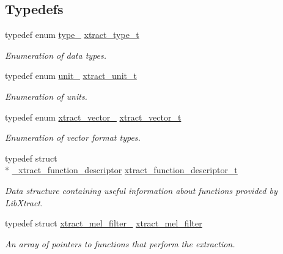 \subsection*{Typedefs}
\begin{DoxyCompactItemize}
\item 
\hypertarget{group__libxtract_ga95b0ed95b4f842dd16e0616aa118ab38}{typedef enum \hyperlink{group__libxtract_ga25b1a5e607667037564acfa9f740d2c8}{type\-\_\-} \hyperlink{group__libxtract_ga95b0ed95b4f842dd16e0616aa118ab38}{xtract\-\_\-type\-\_\-t}}\label{group__libxtract_ga95b0ed95b4f842dd16e0616aa118ab38}

\begin{DoxyCompactList}\small\item\em Enumeration of data types. \end{DoxyCompactList}\item 
\hypertarget{group__libxtract_ga7e9b19dc865a6e8de4da2a8a0d524ed5}{typedef enum \hyperlink{group__libxtract_gab71f92446509ed7f46d35cdb256ee036}{unit\-\_\-} \hyperlink{group__libxtract_ga7e9b19dc865a6e8de4da2a8a0d524ed5}{xtract\-\_\-unit\-\_\-t}}\label{group__libxtract_ga7e9b19dc865a6e8de4da2a8a0d524ed5}

\begin{DoxyCompactList}\small\item\em Enumeration of units. \end{DoxyCompactList}\item 
\hypertarget{group__libxtract_ga1b430fac652725b04dbd5564c11b0c8b}{typedef enum \hyperlink{group__libxtract_ga7347f34a9566e36aa41d95c8838f32cd}{xtract\-\_\-vector\-\_\-} \hyperlink{group__libxtract_ga1b430fac652725b04dbd5564c11b0c8b}{xtract\-\_\-vector\-\_\-t}}\label{group__libxtract_ga1b430fac652725b04dbd5564c11b0c8b}

\begin{DoxyCompactList}\small\item\em Enumeration of vector format types. \end{DoxyCompactList}\item 
\hypertarget{group__libxtract_ga72fe2031f7b7a4cd73879a3fdf358986}{typedef struct \\*
\hyperlink{struct__xtract__function__descriptor}{\-\_\-xtract\-\_\-function\-\_\-descriptor} \hyperlink{group__libxtract_ga72fe2031f7b7a4cd73879a3fdf358986}{xtract\-\_\-function\-\_\-descriptor\-\_\-t}}\label{group__libxtract_ga72fe2031f7b7a4cd73879a3fdf358986}

\begin{DoxyCompactList}\small\item\em Data structure containing useful information about functions provided by Lib\-Xtract. \end{DoxyCompactList}\item 
typedef struct \hyperlink{structxtract__mel__filter__}{xtract\-\_\-mel\-\_\-filter\-\_\-} \hyperlink{group__libxtract_ga77592dbf904343990f181c68dc9c9546}{xtract\-\_\-mel\-\_\-filter}
\begin{DoxyCompactList}\small\item\em An array of pointers to functions that perform the extraction. \end{DoxyCompactList}\end{DoxyCompactItemize}
